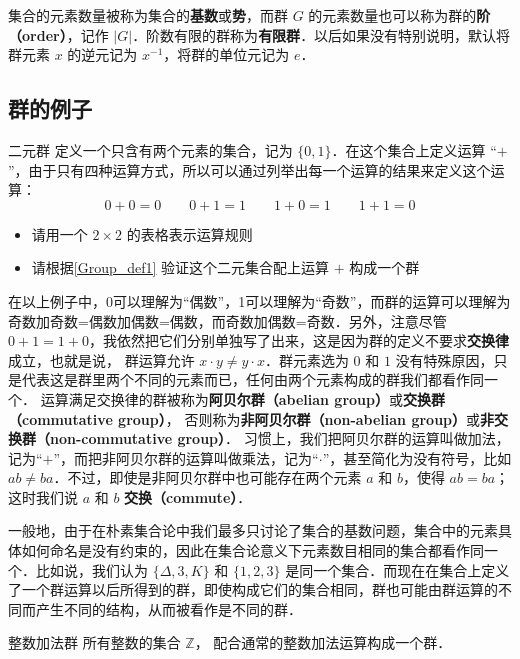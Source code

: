 集合的元素数量被称为集合的\textbf{基数}或\textbf{势}，而群 $G$ 的元素数量也可以称为群的\textbf{阶（order）}，记作 $|G|$．阶数有限的群称为\textbf{有限群}．以后如果没有特别说明，默认将群元素 $x$ 的逆元记为 $x^{-1}$，将群的单位元记为 $e$．

\subsection{群的例子}

\begin{exercise}{二元群}\label{Group_exe1}
定义一个只含有两个元素的集合，记为 $\{0, 1\}$．在这个集合上定义运算 “$+$”，由于只有四种运算方式，所以可以通过列举出每一个运算的结果来定义这个运算：
\begin{equation}\label{Group_eq1}
0+0=0 \qquad 0+1=1 \qquad 1+0=1 \qquad 1+1=0
\end{equation}
\begin{itemize}
\item 请用一个 $2\times2$ 的表格表示运算规则
\item 请根据\autoref{Group_def1} 验证这个二元集合配上运算 $+$ 构成一个群
\end{itemize}
\end{exercise}

在以上例子中，0可以理解为“偶数”，1可以理解为“奇数”，而群的运算可以理解为奇数加奇数=偶数加偶数=偶数，而奇数加偶数=奇数．另外，注意尽管 $0+1=1+0$，我依然把它们分别单独写了出来，这是因为群的定义不要求\textbf{交换律}成立，也就是说， 群运算允许 $x\cdot y\neq y\cdot x$．群元素选为 $0$ 和 $1$ 没有特殊原因，只是代表这是群里两个不同的元素而已，任何由两个元素构成的群我们都看作同一个． 运算满足交换律的群被称为\textbf{阿贝尔群（abelian group）}或\textbf{交换群（commutative group）}， 否则称为\textbf{非阿贝尔群（non-abelian group）}或\textbf{非交换群（non-commutative group）}． 习惯上，我们把阿贝尔群的运算叫做加法，记为“$+$”，而把非阿贝尔群的运算叫做乘法，记为“$\cdot$”，甚至简化为没有符号，比如 $ab\not= ba$．不过，即使是非阿贝尔群中也可能存在两个元素 $a$ 和 $b$，使得 $ab=ba$；这时我们说 $a$ 和 $b$ \textbf{交换（commute）}．

一般地，由于在朴素集合论中我们最多只讨论了集合的基数问题，集合中的元素具体如何命名是没有约束的，因此在集合论意义下元素数目相同的集合都看作同一个．比如说，我们认为 $\{\Delta,3, K\}$ 和 $\{1,2,3\}
$ 是同一个集合．而现在在集合上定义了一个群运算以后所得到的群，即使构成它们的集合相同，群也可能由群运算的不同而产生不同的结构，从而被看作是不同的群．

\begin{example}{整数加法群}\label{Group_ex1}
所有整数的集合 $\mathbb Z$， 配合通常的整数加法运算构成一个群．
\end{example}

